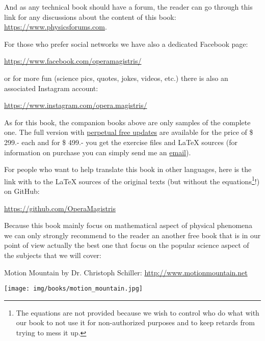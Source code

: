 	And as any technical book should have a forum, the reader can go through this link for any discussions about the content of this book: \url{https://www.physicsforums.com}.
	
	For those who prefer social networks we have also a dedicated Facebook page:
	\begin{center}
		\faFacebook{} \href{https://www.facebook.com/operamagistris/}{https://www.facebook.com/operamagistris/}
	\end{center}
	or for more fun (science pics, quotes, jokes, videos, etc.) there is also an associated Instagram account:
	\begin{center}
		\faInstagram{} \href{https://www.instagram.com/opera.magistris/}{https://www.instagram.com/opera.magistris/}
	\end{center}
	As for this book, the companion books above are only samples of the complete one. The full version with \underline{perpetual free updates} are available for the price of \$ 299.- each and for \$ 499.- you get the exercise files and \LaTeX{} sources (for information on purchase you can simply send me an {\href{mailto:info@sciences.ch}{{\color{blue}email}}}).
	
	For people who want to help translate this book in other languages, here is the link with to the \LaTeX{} sources of the original texts (but without the equations\footnote{The equations are not provided because we wish to control who do what with our book to not use it for non-authorized purposes and to keep retards from trying to mess it up.}!) on GitHub:
	\begin{center}
		\faGithubSquare{} \href{https://github.com/OperaMagistris}{https://github.com/OperaMagistris}
	\end{center}
	Because this book mainly focus on mathematical aspect of physical phenomena we can only strongly recommend to the reader an another free book that is in our point of view actually the best one that focus on the popular science aspect of the subjects that we will cover:
	\begin{center}
	Motion Mountain by Dr. Christoph Schiller: \url{http://www.motionmountain.net}
	\end{center}
	\begin{center}
		\texttt{[image: img/books/motion\_mountain.jpg]}
	\end{center}

